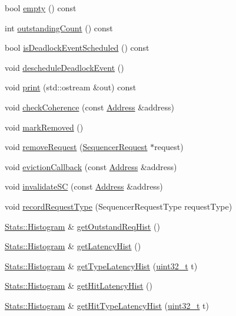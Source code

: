 \begin{DoxyCompactItemize}
bool \hyperlink{classSequencer_ac6e61de369e994009e36f344f99c15ad}{empty} () const 
\item 
int \hyperlink{classSequencer_ae47593dc86baa86bf047ad1fbcdcceed}{outstandingCount} () const 
\item 
bool \hyperlink{classSequencer_a11ce018fbd3aa89624b06dbdafbd4ef9}{isDeadlockEventScheduled} () const 
\item 
void \hyperlink{classSequencer_a7c9a8861621a62055761f47310814762}{descheduleDeadlockEvent} ()
\item 
void \hyperlink{classSequencer_ac55fe386a101fbae38c716067c9966a0}{print} (std::ostream \&out) const 
\item 
void \hyperlink{classSequencer_a381b1e1191b76356f0a37f22b3d19c52}{checkCoherence} (const \hyperlink{classAddress}{Address} \&address)
\item 
void \hyperlink{classSequencer_a2e67c7ecd7fa83154e841e80a502130d}{markRemoved} ()
\item 
void \hyperlink{classSequencer_a525e0db39943b198c53fc6e8356f6050}{removeRequest} (\hyperlink{structSequencerRequest}{SequencerRequest} $\ast$request)
\item 
void \hyperlink{classSequencer_a3af79aeefd596a230ebc3a579fcc3fb1}{evictionCallback} (const \hyperlink{classAddress}{Address} \&address)
\item 
void \hyperlink{classSequencer_ab328ca1fdc98e525561d4fc99de4757c}{invalidateSC} (const \hyperlink{classAddress}{Address} \&address)
\item 
void \hyperlink{classSequencer_a2fa76b7c47843db1ca8a852a1b4fdb49}{recordRequestType} (SequencerRequestType requestType)
\item 
\hyperlink{classStats_1_1Histogram}{Stats::Histogram} \& \hyperlink{classSequencer_aad0db21fdf9ff4bdf60a45e0eea9ef12}{getOutstandReqHist} ()
\item 
\hyperlink{classStats_1_1Histogram}{Stats::Histogram} \& \hyperlink{classSequencer_ac46dd25fc33d37a54c700053c1f79314}{getLatencyHist} ()
\item 
\hyperlink{classStats_1_1Histogram}{Stats::Histogram} \& \hyperlink{classSequencer_ad93cd72a0644b8593762e57de8dcaef3}{getTypeLatencyHist} (\hyperlink{Type_8hh_a435d1572bf3f880d55459d9805097f62}{uint32\_\-t} t)
\item 
\hyperlink{classStats_1_1Histogram}{Stats::Histogram} \& \hyperlink{classSequencer_a60d594e19c05f710687dabeccab69cb4}{getHitLatencyHist} ()
\item 
\hyperlink{classStats_1_1Histogram}{Stats::Histogram} \& \hyperlink{classSequencer_a4996199be67d053287bec8a2fa742ee0}{getHitTypeLatencyHist} (\hyperlink{Type_8hh_a435d1572bf3f880d55459d9805097f62}{uint32\_\-t} t)

\end{DoxyCompactItemize}
